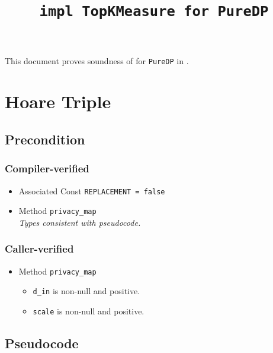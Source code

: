 \documentclass{article}
\title{\texttt{impl TopKMeasure for PureDP}}
\author{\TudorCebereAuthor \and \MichaelShoemateAuthor}
\begin{document}
\maketitle
\contrib

This document proves soundness of  for \texttt{PureDP} in .

\section{Hoare Triple}
\subsection*{Precondition}
\subsubsection*{Compiler-verified}
\begin{itemize}
    \item Associated Const \texttt{REPLACEMENT = false}
    \item Method \texttt{privacy\_map} \\
        \textit{Types consistent with pseudocode.}
\end{itemize}

\subsubsection*{Caller-verified}
\begin{itemize}
    \item Method \texttt{privacy\_map}
        \begin{itemize}
            \item \texttt{d\_in} is non-null and positive.
            \item \texttt{scale} is non-null and positive.
        \end{itemize}
\end{itemize}

\subsection*{Pseudocode}
\label{sec:python-pseudocode}

\end{document}
